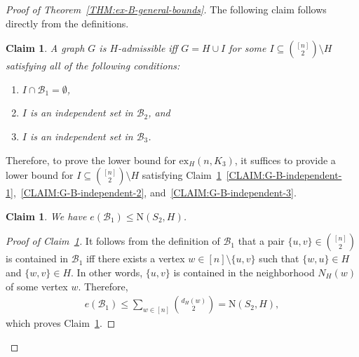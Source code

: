 \documentclass[11pt,a4paper]{article}
\newtheorem{claim}[definition]{Claim}
\newcommand{\graph}{H}
\begin{document}
\begin{proof}[Proof of Theorem~\ref{THM:ex-B-general-bounds}]
    The following claim follows directly from the definitions. 

    \begin{claim}\label{CLAIM:G-B-independent}
        A graph $G$ is $\graph$-admissible iff $G = \graph \cup I$ for some $I \subseteq \binom{[n]}{2} \setminus \graph$ satisfying all of the following conditions: 
        \begin{enumerate}[label=(\roman*)]
            \item\label{CLAIM:G-B-independent-1} $I \cap \mathcal{B}_{1} = \emptyset$, 
            \item\label{CLAIM:G-B-independent-2} $I$ is an independent set in $\mathcal{B}_{2}$, and 
            \item\label{CLAIM:G-B-independent-3} $I$ is an independent set in $\mathcal{B}_{3}$. 
        \end{enumerate}
    \end{claim}

    Therefore, to prove the lower bound for $\mathrm{ex}_{\graph}(n,K_{3})$, it suffices to provide a lower bound for $I \subseteq \binom{[n]}{2} \setminus \graph$ satisfying Claim~\ref{CLAIM:G-B-independent}~\ref{CLAIM:G-B-independent-1},~\ref{CLAIM:G-B-independent-2}, and~\ref{CLAIM:G-B-independent-3}. 


    \begin{claim}\label{CLAIM:B1-size-upper-bound}
        We have $e(\mathcal{B}_{1}) \le \mathrm{N}(S_{2}, \graph)$.
    \end{claim}
    \begin{proof}[Proof of Claim~\ref{CLAIM:B1-size-upper-bound}]
        It follows from the definition of $\mathcal{B}_{1}$ that a pair $\{u,v\} \in \binom{[n]}{2}$ is contained in $\mathcal{B}_{1}$ iff there exists a vertex $w \in [n] \setminus \{u,v\}$ such that $\{w,u\} \in \graph$ and $\{w,v\} \in \graph$. In other words, $\{u,v\}$ is contained in the neighborhood $N_{\graph}(w)$ of some vertex $w$. 
        Therefore, 
        \begin{align*}
            e(\mathcal{B}_{1})
            \le \sum_{w\in [n]} \binom{d_{\graph}(w)}{2}
            = \mathrm{N}(S_2, \graph),
        \end{align*}
        which proves Claim~\ref{CLAIM:B1-size-upper-bound}. 
    \end{proof}%


\end{proof}
\end{document}

